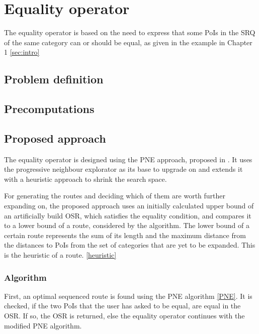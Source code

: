 \section{Equality operator}
The equality operator is based on the need to express that some PoIs in the SRQ of the same category can or should be equal, as given in the example in Chapter 1 \ref{sec:intro}

\subsection{Problem definition} 
\label{sec:problem}

\subsection{Precomputations} 
\label{sec:precomp}

\subsection{Proposed approach} 
\label{sec:approach}
The equality operator is designed using the PNE approach, proposed in \cite{OSR}. It uses the progressive neighbour explorator as  its base to upgrade on and extends it with a heuristic approach to shrink the search space. \newline

For generating the routes and deciding which of them are worth further expanding on, the proposed approach uses an initially calculated upper bound of an artificially build OSR, which satisfies the equality condition, and compares it to a lower bound of a route, considered by the algorithm. The lower bound of a certain route represents the sum of its length and the maximum distance from the distances to PoIs from the set of categories that are yet to be expanded. This is the heuristic of a route. \ref{heuristic}

\subsubsection{Algorithm}
\label{sec:design}
First, an optimal sequenced route is found using the PNE algorithm \ref{PNE}. It is checked, if the two PoIs that the user has asked to be equal, are equal in the OSR. If so, the OSR is returned, else the equality operator continues with the modified PNE algorithm.

